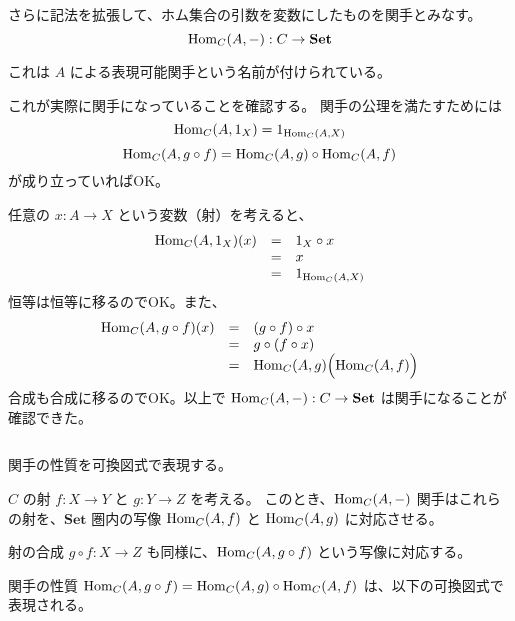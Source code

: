\documentclass[uplatex,a4j,12pt,dvipdfmx]{jsarticle}
\begin{document}
さらに記法を拡張して、ホム集合の引数を変数にしたものを関手とみなす。
\[
	{\rm Hom}_{C}(A,-) : C \to \mathbf{Set}
\]

これは $A$ による表現可能関手という名前が付けられている。

これが実際に関手になっていることを確認する。
関手の公理を満たすためには
\[
	{\rm Hom}_{C}(A,1_{X}) = 1_{{\rm Hom}_{C} (A,X)}
\]
\[
	{\rm Hom}_{C}(A,g \circ f) = {\rm Hom}_{C} (A,g) \circ {\rm Hom}_{C} (A,f)
\]
が成り立っていればOK。

任意の
$x: A \to X$
という変数（射）を考えると、
\[
	\begin{array}{rcl}
		{\rm Hom}_{C}(A,1_{X})(x) & = & 1_{X} \circ x           \\
		                          & = & x                       \\
		                          & = & 1_{{\rm Hom}_{C} (A,X)}
	\end{array}
\]
恒等は恒等に移るのでOK。また、
\[
	\begin{array}{rcl}
		{\rm Hom}_{C}(A,g \circ f)(x) & = & (g \circ f) \circ x                               \\
		                              & = & g \circ (f \circ x)                               \\
		                              & = & {\rm Hom}_{C}(A,g) \Big( {\rm Hom}_{C}(A,f) \Big)
	\end{array}
\]
合成も合成に移るのでOK。以上で
${\rm Hom}_{C}(A,-) : C \to \mathbf{Set}$
は関手になることが確認できた。

${}$

関手の性質を可換図式で表現する。

$C$ の射 $f: X \to Y$ と $g: Y \to Z$ を考える。
このとき、${\rm Hom}_{C}(A,-)$ 関手はこれらの射を、$\mathbf{Set}$ 圏内の写像 ${\rm Hom}_{C}(A,f)$ と ${\rm Hom}_{C}(A,g)$ に対応させる。

射の合成
$g \circ f: X \to Z$
も同様に、${\rm Hom}_{C}(A,g \circ f)$ という写像に対応する。

関手の性質
${\rm Hom}_{C}(A,g \circ f) = {\rm Hom}_{C} (A,g) \circ {\rm Hom}_{C}(A,f)$
は、以下の可換図式で表現される。
\end{document}

